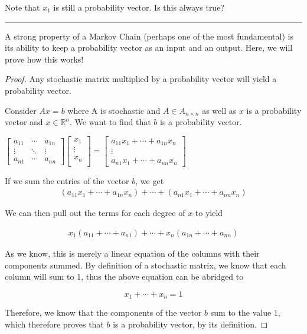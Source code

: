 \documentclass{article}
\begin{document}
Note that $x_1$ is still a probability vector. Is this always true?

\rule{\textwidth}{0.5pt}

A strong property of a Markov Chain (perhaps one of the most fundamental) is its ability to keep a probability vector as an input and an output. Here, we will prove how this works!

\begin{proof} Any stochastic matrix multiplied by a probability vector will yield a probability vector.

Consider $Ax=b$ where A is stochastic and $A \in A_{n\times n}$ as well as $x$ is a probability vector and  $x\in\mathbb{R}^n$. We want to find that $b$ is a probability vector.

\begin{center}
    $\begin{bmatrix}
        a_{11} & \cdots & a_{1n}\\
        \vdots & \ddots & \vdots \\
        a_{n1} & \cdots & a_{nn}
    \end{bmatrix}\begin{bmatrix}
        x_{1} \\ \vdots \\ x_{n}\\
    \end{bmatrix} = \begin{bmatrix}
     a_{11}x_1+\cdots +a_{1n}x_n\\ \vdots \\ a_{n1}x_1+\cdots +a_{nn}x_{n}
    \end{bmatrix}$
\end{center}
    
If we sum the entries of the vector $b$, we get
    \begin{align*}
    (a_{11}x_1+\cdots + a_{1n}x_n)+\cdots+(a_{n1}x_1+\cdots +a_{nn}x_{n})
    \end{align*}

We can then pull out the terms for each degree of $x$ to yield

\begin{align*}
    x_1(a_{11}+\cdots +a_{n1})+\cdots +x_n(a_{1n}+\cdots +a_{nn})
\end{align*}

As we know, this is merely a linear equation of the columns with their components summed. By definition of a stochastic matrix, we know that each column will sum to 1, thus the above equation can be abridged to

\begin{equation*}
    x_1+\cdots +x_{n}=1
\end{equation*}

Therefore, we know that the components of the vector $b$ sum to the value $1$, which therefore proves that $b$ is a probability vector, by its definition.

\end{proof}
\end{document}
